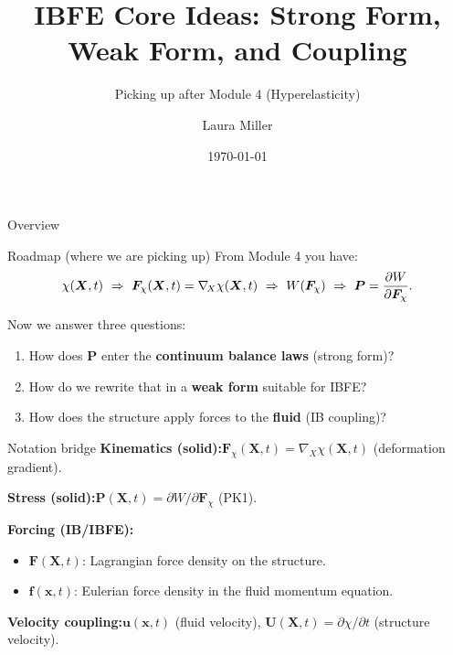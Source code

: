 \documentclass[aspectratio=169]{beamer}
\title[IBFE Core Ideas]{IBFE Core Ideas: Strong Form, Weak Form, and Coupling}
\subtitle{Picking up after Module 4 (Hyperelasticity)}
\author{Laura Miller}
\institute{University of Arizona}
\date{\today}
\newcommand{\x}{\bm{x}}
\newcommand{\X}{\bm{X}}
\newcommand{\gradX}{\nabla_{\!X}}
\newcommand{\Pten}{\bm{P}}        %
\newcommand{\Fdef}{\bm{F}_{\chi}} %
\newcommand{\FLag}{\bm{F}}       %
\newcommand{\fEuler}{\bm{f}}     %
\newcommand{\uEuler}{\bm{u}}     %
\newcommand{\ULag}{\bm{U}}       %
\begin{document}
\begin{frame}
  \titlepage
\end{frame}

\begin{frame}{Overview}
\tableofcontents
\end{frame}
% 
\begin{frame}{Roadmap (where we are picking up)}
\small
From Module 4 you have:
\[
\chi(\X,t)\ \Rightarrow\ \Fdef(\X,t)=\gradX\chi(\X,t)\ \Rightarrow\ W(\Fdef)\ \Rightarrow\ \Pten=\pdv{W}{\Fdef}.
\]

\medskip
Now we answer three questions:
\begin{enumerate}
\item How does \(\Pten\) enter the \textbf{continuum balance laws} (strong form)?
\item How do we rewrite that in a \textbf{weak form} suitable for IBFE?
\item How does the structure apply forces to the \textbf{fluid} (IB coupling)?
\end{enumerate}

\end{frame}

\begin{frame}{Notation bridge}
\small
\textbf{Kinematics (solid):}\quad \(\Fdef(\X,t)=\gradX\chi(\X,t)\) (deformation gradient).

\medskip
\textbf{Stress (solid):}\quad \(\Pten(\X,t)=\partial W/\partial \Fdef\) (PK1).

\medskip
\textbf{Forcing (IB/IBFE):}
\begin{itemize}
\item \(\FLag(\X,t)\): Lagrangian force density on the structure.
\item \(\fEuler(\x,t)\): Eulerian force density in the fluid momentum equation.
\end{itemize}

\medskip
\textbf{Velocity coupling:}\quad \(\uEuler(\x,t)\) (fluid velocity), \(\ULag(\X,t)=\partial\chi/\partial t\) (structure velocity).
\end{frame}
\end{document}
